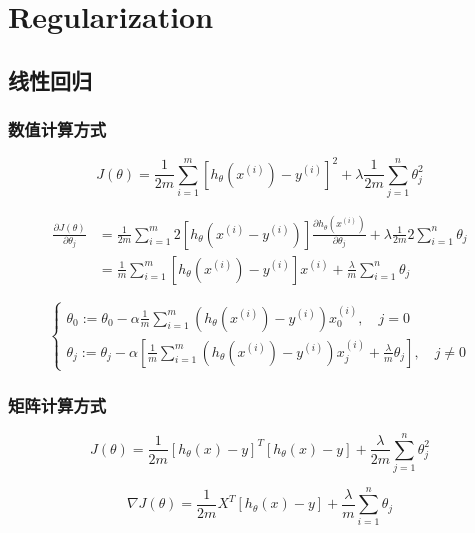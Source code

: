 \section{Regularization}
\subsection{线性回归}


\subsubsection{数值计算方式}
\begin{equation}
	J(\theta) = \frac{1}{2m}\sum_{i=1}^m [h_\theta(x^{(i)})-y^{(i)}]^2 + \lambda \frac{1}{2m} \sum_{j=1}^n\theta_j^2
\end{equation}

\begin{equation}\begin{aligned}
	\frac{\partial{J(\theta)}}{\partial{\theta_j}} &= \frac{1}{2m}\sum_{i=1}^m 2[h_\theta(x^{(i)}-y^{(i)})] \frac{\partial{h_\theta(x^{(i)})}}{\partial{\theta_j}} + \lambda \frac{1}{2m} 2 \sum_{i=1}^n \theta_j \\
	    &= \frac{1}{m}\sum_{i=1}^m[h_\theta(x^{(i)})-y^{(i)}]x^{(i)} + \frac{\lambda}{m}\sum_{i=1}^n \theta_j
\end{aligned}\end{equation}

\[\begin{cases}
	\theta_0 := \theta_0 - \alpha \frac{1}{m} \sum_{i=1}^m(h_\theta(x^{(i)}) - y^{(i)})x_0^{(i)}, \quad j=0 \\
	\theta_j := \theta_j - \alpha [\frac{1}{m} \sum_{i=1}^m(h_\theta(x^{(i)}) - y^{(i)})x_j^{(i)} + \frac{\lambda}{m}\theta_j], \quad j \neq 0
\end{cases}\]


\subsubsection{矩阵计算方式}
\begin{equation}
	J(\theta) = \frac{1}{2m} \left[h_\theta(x) - y\right]^T \left[ h_\theta(x) - y\right] + \frac{\lambda}{2m} \sum_{j=1}^n\theta_j^2
\end{equation}

\begin{equation}
	\nabla J(\theta) = \frac{1}{2m} X^T \left[h_\theta(x) - y\right] + \frac{\lambda}{m}\sum_{i=1}^n \theta_j
\end{equation}


